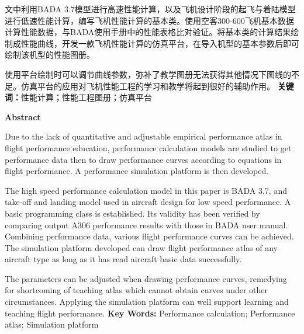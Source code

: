 \documentclass[a4paper,punct,space,heading=true,AutoFakeBold]{ctexrep}
\newcommand{\hei}{\CJKfamily{hei}}
\newcommand{\song}{\CJKfamily{song}}
\begin{document}
文中利用BADA 3.7模型进行高速性能计算，以及飞机设计阶段的起飞与着陆模型进行低速性能计算，编写飞机性能计算的基本类。使用空客300-600飞机基本数据计算性能数据，与BADA使用手册中的性能表格比对验证。将基本类的计算结果绘制成性能曲线，开发一款飞机性能计算的仿真平台，在导入机型的基本参数后即可绘制该机型的性能图册。

使用平台绘制时可以调节曲线参数，弥补了教学图册无法获得其他情况下图线的不足。仿真平台的应用对飞机性能工程的学习和教学将起到很好的辅助作用。
\newline
\newline
\indent{}\songti\textbf{关键词：}\song 性能计算；性能工程图册；仿真平台
\newpage

\setlength{\headsep}{1.224cm}
\begin{center}
\hei \bfseries Abstract
\end{center}
\vspace{21pt}

Due to the lack of quantitative and adjustable empirical performance atlas in flight performance education, performance calculation models are studied to get performance data then to draw performance curves according to equations in flight performance. A performance simulation platform is then developed.

The high speed performance calculation model in this paper is BADA 3.7, and take-off and landing model used in aircraft design for low speed performance. A basic programming class is established. Its validity has been verified by comparing output A306 performance results with those in BADA user manual. Combining performance data, various flight performance curves can be achieved. The simulation platform developed can draw flight performance atlas of any aircraft type as long as it has read aircraft basic data successfully.

The parameters can be adjusted when drawing performance curves, remedying for shortcoming of teaching atlas which cannot obtain curves under other circumstances. Applying the simulation platform can well support learning and teaching flight performance.
\newline
\newline
\indent{}\textbf{Key Words: }Performance calculation; Performance atlas; Simulation platform


\newpage
\setlength{\headsep}{-0.3cm}
\setcounter{page}{1}
\tableofcontents
\thispagestyle{plain}
\newpage
\setcounter{page}{1}
\newpage
\end{document}
